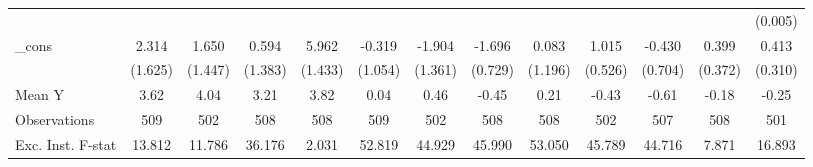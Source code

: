 {\begin{tabular}{l*{12}{c}}
            &                     &                     &                     &                     &                     &                     &                     &                     &                     &                     &                     &     (0.005)         \\
\addlinespace
\_cons      &       2.314         &       1.650         &       0.594         &       5.962\sym{***}&      -0.319         &      -1.904         &      -1.696\sym{**} &       0.083         &       1.015\sym{*}  &      -0.430         &       0.399         &       0.413         \\
            &     (1.625)         &     (1.447)         &     (1.383)         &     (1.433)         &     (1.054)         &     (1.361)         &     (0.729)         &     (1.196)         &     (0.526)         &     (0.704)         &     (0.372)         &     (0.310)         \\
\midrule
Mean Y      &        3.62         &        4.04         &        3.21         &        3.82         &        0.04         &        0.46         &       -0.45         &        0.21         &       -0.43         &       -0.61         &       -0.18         &       -0.25         \\
Observations&         509         &         502         &         508         &         508         &         509         &         502         &         508         &         508         &         502         &         507         &         508         &         501         \\
Exc. Inst. F-stat&      13.812         &      11.786         &      36.176         &       2.031         &      52.819         &      44.929         &      45.990         &      53.050         &      45.789         &      44.716         &       7.871         &      16.893         \\
\bottomrule
\end{tabular}
}
